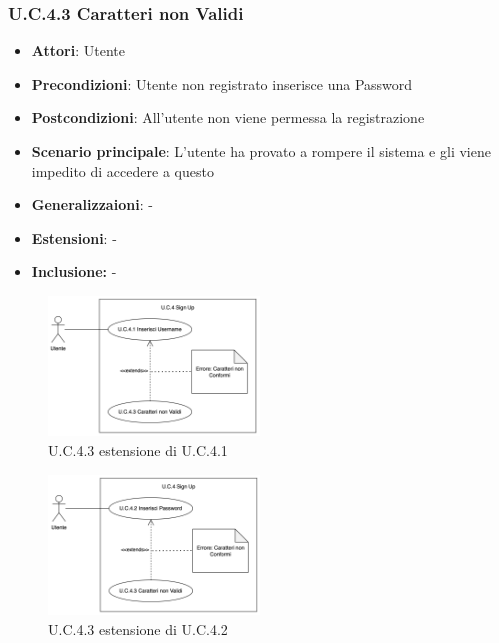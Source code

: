 \subsubsection{U.C.4.3 Caratteri non Validi}
\begin{itemize}
    \item \textbf{Attori}: Utente
    \item \textbf{Precondizioni}: Utente non registrato inserisce una Password
    \item \textbf{Postcondizioni}: All'utente non viene permessa la registrazione
    \item \textbf{Scenario principale}: L'utente ha provato a rompere il sistema e gli viene impedito di accedere a questo
    \item \textbf{Generalizzaioni}: -
    \item \textbf{Estensioni}: -
    \item \textbf{Inclusione:} -
\end{itemize}
\begin{figure}[h!]
    \centering
    \includegraphics[width=0.5\textwidth]{img/UC4-3.png}
    \caption{U.C.4.3 estensione di U.C.4.1}
\end{figure}
\begin{figure}[h!]
    \centering
    \includegraphics[width=0.5\textwidth]{img/UC4-3-2.png}
    \caption{U.C.4.3 estensione di U.C.4.2}
\end{figure}
